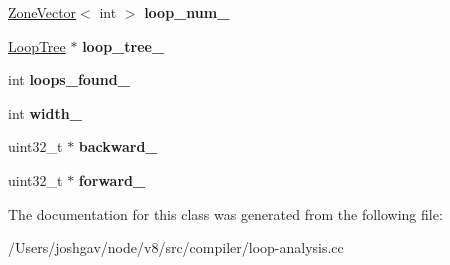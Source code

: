 \begin{DoxyCompactItemize}
\item 
\hyperlink{classv8_1_1internal_1_1_zone_vector}{Zone\+Vector}$<$ int $>$ {\bfseries loop\+\_\+num\+\_\+}\hypertarget{classv8_1_1internal_1_1compiler_1_1_loop_finder_impl_a4404157482ebe66453bdbce99d7c0a2d}{}\label{classv8_1_1internal_1_1compiler_1_1_loop_finder_impl_a4404157482ebe66453bdbce99d7c0a2d}

\item 
\hyperlink{classv8_1_1internal_1_1compiler_1_1_loop_tree}{Loop\+Tree} $\ast$ {\bfseries loop\+\_\+tree\+\_\+}\hypertarget{classv8_1_1internal_1_1compiler_1_1_loop_finder_impl_a4511c1f19abdc8e0c82ea7d063b65525}{}\label{classv8_1_1internal_1_1compiler_1_1_loop_finder_impl_a4511c1f19abdc8e0c82ea7d063b65525}

\item 
int {\bfseries loops\+\_\+found\+\_\+}\hypertarget{classv8_1_1internal_1_1compiler_1_1_loop_finder_impl_a0af6403e8cdced99762db3be2f293a66}{}\label{classv8_1_1internal_1_1compiler_1_1_loop_finder_impl_a0af6403e8cdced99762db3be2f293a66}

\item 
int {\bfseries width\+\_\+}\hypertarget{classv8_1_1internal_1_1compiler_1_1_loop_finder_impl_ac063634696446a92b56c3cc4d3195f0d}{}\label{classv8_1_1internal_1_1compiler_1_1_loop_finder_impl_ac063634696446a92b56c3cc4d3195f0d}

\item 
uint32\+\_\+t $\ast$ {\bfseries backward\+\_\+}\hypertarget{classv8_1_1internal_1_1compiler_1_1_loop_finder_impl_a4b4b8e4fbc04cbcae07d02a2d802cce2}{}\label{classv8_1_1internal_1_1compiler_1_1_loop_finder_impl_a4b4b8e4fbc04cbcae07d02a2d802cce2}

\item 
uint32\+\_\+t $\ast$ {\bfseries forward\+\_\+}\hypertarget{classv8_1_1internal_1_1compiler_1_1_loop_finder_impl_a10cdcd61dc4bdbb91ab7cd97db6703b0}{}\label{classv8_1_1internal_1_1compiler_1_1_loop_finder_impl_a10cdcd61dc4bdbb91ab7cd97db6703b0}

\end{DoxyCompactItemize}


The documentation for this class was generated from the following file\+:\begin{DoxyCompactItemize}
\item 
/\+Users/joshgav/node/v8/src/compiler/loop-\/analysis.\+cc\end{DoxyCompactItemize}
